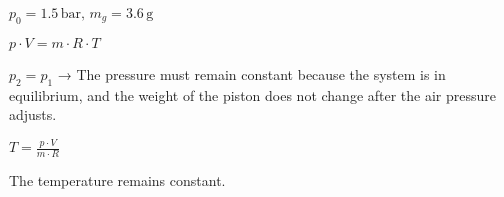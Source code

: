 \( p_0 = 1.5 \, \text{bar}, \, m_g = 3.6 \, \text{g} \)  

\( p \cdot V = m \cdot R \cdot T \)  

\( p_2 = p_1 \) → The pressure must remain constant because the system is in equilibrium, and the weight of the piston does not change after the air pressure adjusts.  

\( T = \frac{p \cdot V}{m \cdot R} \)  

The temperature remains constant.